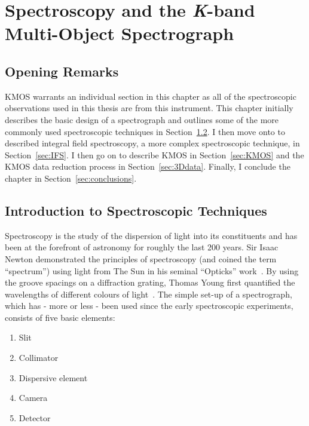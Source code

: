 \chapter{Spectroscopy and the {\it K}-band Multi-Object Spectrograph}
\label{ch:kmos}
\section{Opening Remarks} %
\label{sec:opening_remarks}
KMOS warrants an individual section in this chapter as all of the spectroscopic observations used in this thesis are from this instrument.
This chapter initially describes the basic design of a spectrograph and outlines some of the more commonly used spectroscopic techniques in Section~\ref{sec:intro_to_spec}.
I then move onto to described integral field spectroscopy, a more complex spectroscopic technique, in Section~\ref{sec:IFS}.
I then go on to describe KMOS in Section~\ref{sec:KMOS} and the KMOS data reduction process in Section~\ref{sec:3Ddata}.
Finally, I conclude the chapter in Section~\ref{sec:conclusions}.



\section{Introduction to Spectroscopic Techniques} %
\label{sec:intro_to_spec}

Spectroscopy is the study of the dispersion of light into its constituents and has been at the forefront of astronomy for roughly the last 200 years.
Sir Isaac Newton demonstrated the principles of spectroscopy (and coined the term ``spectrum'') using light from The Sun in his seminal ``Opticks'' work~\citep{b:Newton}.
By using the groove spacings on a diffraction grating, Thomas Young first quantified the wavelengths of different colours of light~\citep{1802PTRSL.92.12Y}.
The simple set-up of a spectrograph, which has - more or less - been used since the early spectroscopic experiments, consists of five basic elements:


\begin{enumerate}
    \item Slit
    \item Collimator
    \item Dispersive element
    \item Camera
    \item Detector
\end{enumerate}

